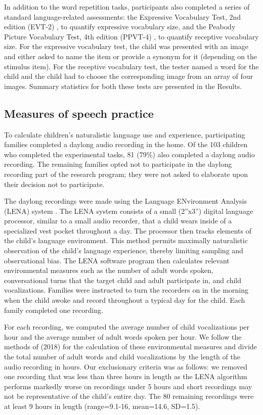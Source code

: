 \documentclass[a4paper,man,natbib,donotrepeattitle, apacite]{apa6}
\begin{document}
In addition to the word repetition tasks, participants also completed a series of standard language-related assessments: the Expressive Vocabulary Test, 2nd edition (EVT-2) \cite{williamsExpressiveVocabularyTest2007}, to quantify expressive vocabulary size, and the Peabody Picture Vocabulary Test, 4th edition (PPVT-4) \cite{dunnPPVT4PeabodyPicture2007}, to quantify receptive vocabulary size. For the expressive vocabulary test, the child was presented with an image and either asked to name the item or provide a synonym for it (depending on the stimulus item). For the receptive vocabulary test, the tester named a word for the child and the child had to choose the corresponding image from an array of four images. Summary statistics for both these tests are presented in the Results.

\subsection{Measures of speech practice}

To calculate children’s naturalistic language use and experience, participating families completed a daylong audio recording in the home. Of the 103 children who completed the experimental tasks, 81 (79\%) also completed a daylong audio recording. The remaining families opted not to participate in the daylong recording part of the research program; they were not asked to elaborate upon their decision not to participate. 

The daylong recordings were made using the Language ENvironment Analysis (LENA) system \cite{greenwoodAssessingChildrenHome2011}. The LENA system consists of a small (2”x3”) digital language processor, similar to a small audio recorder, that a child wears inside of a specialized vest pocket throughout a day. The processor then tracks elements of the child’s language environment. This method permits maximally naturalistic observation of the child’s language experience, thereby limiting sampling and observational bias. The LENA software program then calculates relevant environmental measures such as the number of adult words spoken, conversational turns that the target child and adult participate in, and child vocalizations. Families were instructed to turn the recorders on in the morning when the child awoke and record throughout a typical day for the child. Each family completed one recording. 

For each recording, we computed the average number of child vocalizations per hour and the average number of adult words spoken per hour. We follow the methods of \citeauthor{mahrUsingLanguageInput2018} (2018) for the calculation of these environmental measures and divide the total number of adult words and child vocalizations by the length of the audio recording in hours. Our exclusionary criteria was as follows: we removed one recording that was less than three hours in length as the LENA algorithm performs markedly worse on recordings under 5 hours \cite{xuReliabilityLENALanguage2009} and short recordings may not be representative of the child’s entire day. The 80 remaining recordings were at least 9 hours in length (range=9.1-16, mean=14.6, SD=1.5).
\end{document}
